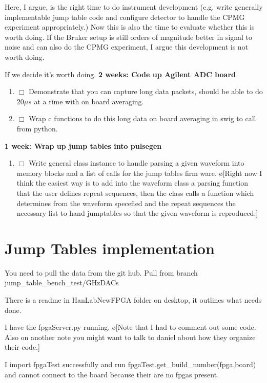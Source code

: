 \documentclass[10pt]{book}
\begin{document}
Here, I argue, is the right time to do instrument development (e.g. write generally implementable jump table code and configure detector to handle the CPMG experiment appropriately.) Now this is also the time to evaluate whether this is worth doing. If the Bruker setup is still orders of magnitude better in signal to noise and can also do the CPMG experiment, I argue this development is not worth doing.

If we decide it's worth doing.
{\bf 2 weeks: Code up Agilent ADC board}
\begin{enumerate}
    \item $\Box$ Demonstrate that you can capture long data packets, should be able to do $20 \mu s$ at a time with on board averaging.
    \item $\Box$ Wrap c functions to do this long data on board averaging in swig to call from python.\\
\end{enumerate}

{\bf 1 week: Wrap up jump tables into pulsegen}
\begin{enumerate}
    \item $\Box$ Write general class instance to handle parsing a given waveform into memory blocks and a list of calls for the jump tables firm ware. \o[Right now I think the easiest way is to add into the waveform class a parsing function that the user defines repeat sequences, then the class calls a function which determines from the waveform specefied and the repeat sequences the necessary list to hand jumptables so that the given waveform is reproduced.]{}\\
\end{enumerate}

\section{Jump Tables implementation}
You need to pull the data from the git hub. Pull from branch jump\_table\_bench\_test/GHzDACs

There is a readme in HanLabNewFPGA folder on desktop, it outlines what needs done.

I have the fpgaServer.py running. \o[Note that I had to comment out some code. Also on another note you might want to talk to daniel about how they organize their code.]{}

I import fpgaTest successfully and run fpgaTest.get\_build\_number(fpga,board) and cannot connect to the board because their are no fpgas present.
\end{document}
